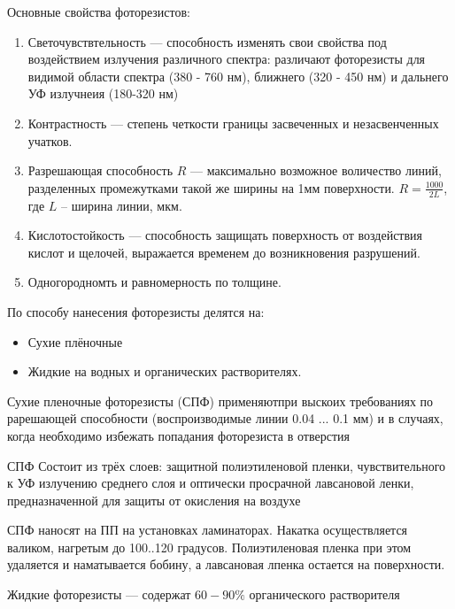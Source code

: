 \documentclass{article}
\begin{document}
Основные свойства фоторезистов:
\begin{enumerate}
	\item Светочувствтельность --- способность изменять свои свойства под воздействием излучения различного спектра: различают фоторезисты для видимой области спектра (380 - 760 нм), ближнего (320 - 450 нм) и дальнего УФ излучнеия (180-320 нм)
	\item Контрастность --- степень четкости границы засвеченных и незасвенченных учатков.
	\item Разрешающая способность $R$ --- максимально возможное воличество линий, разделенных промежутками такой же ширины на 1мм поверхности. $R = \frac{1000}{2L} $, где $L$ -- ширина линии, мкм.
	\item Кислотостойкость --- способность защищать поверхность от воздействия кислот и щелочей, выражается временем до возникновения разрушений.
	\item Одногородномть и равномерность по толщине.
\end{enumerate}

По способу нанесения фоторезисты делятся на:
\begin{itemize}
	\item Сухие плёночные
	\item Жидкие на водных и органических растворителях.
\end{itemize}

Сухие пленочные фоторезисты (СПФ) применяютпри выскоих требованиях по рарешающей способности (воспроизводимые линии 0.04 ... 0.1 мм) и в случаях, когда необходимо избежать попадания фоторезиста в отверстия

СПФ Состоит из трёх слоев: защитной полиэтиленовой пленки, чувствительного к УФ излучению среднего слоя и оптически просрачной лавсановой ленки, предназначенной для защиты от окисления на воздухе

СПФ наносят на ПП на установках ламинаторах. Накатка осуществляется валиком, нагретым до 100..120 градусов. Полиэтиленовая пленка при этом удаляется и наматывается бобину, а лавсановая лпенка остается на поверхности.

Жидкие фоторезисты --- содержат $60-90\%$ органического растворителя
\end{document}
